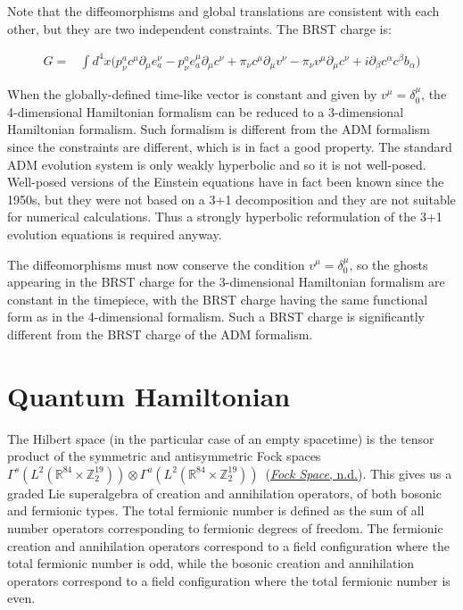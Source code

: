 \documentclass[11pt]{book}
\begin{document}
Note that the diffeomorphisms and global translations are consistent
with each other, but they are two independent constraints. The BRST
charge is:

\begin{equation}\begin{aligned}
    G=& \int d^4x \biggl(p_{\nu}^{a}c^{\mu}\partial_{\mu}e^{\nu}_{a}-p_{\nu}^{a}e^{\mu}_{a}\partial_{\mu}c^{\nu}
    +\pi_{\nu}c^{\mu}\partial_{\mu}v^{\nu}-\pi_{\nu}v^{\mu}\partial_{\mu}c^{\nu}
    +i \partial_{\beta}c^{\alpha} c^{\beta}b_{\alpha}\biggr)\end{aligned}\end{equation}

When the globally-defined time-like vector is constant and given by
\(v^\mu=\delta^\mu_0\), the 4-dimensional Hamiltonian formalism can be
reduced to a 3-dimensional Hamiltonian formalism. Such formalism is
different from the ADM formalism since the constraints are different,
which is in fact a good property. The standard ADM evolution system is
only weakly hyperbolic and so it is not
well-posed\cite{Alcubierre2008Introduction}. Well-posed versions of the Einstein equations have in fact been
known since the 1950s, but they were not based on a 3+1 decomposition
and they are not suitable for numerical
calculations\cite{Alcubierre2008Introduction}. Thus a strongly hyperbolic reformulation of the 3+1 evolution
equations is required
anyway\cite{Alcubierre2008Introduction}.

The diffeomorphisms must now conserve the condition
\(v^\mu=\delta^\mu_0\), so the ghosts appearing in the BRST charge for
the 3-dimensional Hamiltonian formalism are constant in the timepiece,
with the BRST charge having the same functional form as in the
4-dimensional formalism. Such a BRST charge is significantly different
from the BRST charge of the ADM formalism.

\hypertarget{quantum-hamiltonian}{%
\section{Quantum Hamiltonian}\label{quantum-hamiltonian}}

The Hilbert space (in the particular case of an empty spacetime) is the
tensor product of the symmetric and antisymmetric Fock spaces
\(\Gamma^s(L^2(\mathbb{R}^{84}\times \mathbb{Z}_2^{19}))\otimes \Gamma^a(L^2(\mathbb{R}^{84}\times\mathbb{Z}_2^{19})) \)~\cite{Petz:1990gb}(\protect\hyperlink{ref-Fock}{\emph{Fock Space}, n.d.}). This
gives us a graded Lie superalgebra of creation and annihilation
operators, of both bosonic and fermionic types. The total fermionic
number is defined as the sum of all number operators corresponding to
fermionic degrees of freedom. The fermionic creation and annihilation
operators correspond to a field configuration where the total fermionic
number is odd, while the bosonic creation and annihilation operators
correspond to a field configuration where the total fermionic number is
even.
\end{document}
